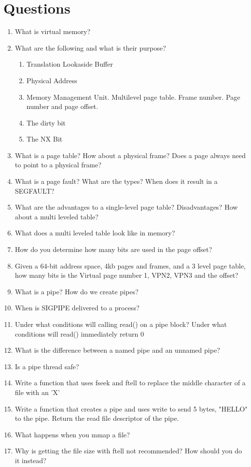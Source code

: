 \section{Questions}

\begin{enumerate}
\item What is virtual memory?
\item What are the following and what is their purpose?
  \begin{enumerate}
    \item Translation Lookaside Buffer
    \item Physical Address
    \item Memory Management Unit. Multilevel page table. Frame number. Page number and page offset.
    \item The dirty bit
    \item The NX Bit
  \end{enumerate}
\item What is a page table? How about a physical frame? Does a page always need to point to a physical frame?
\item What is a page fault? What are the types? When does it result in a SEGFAULT?
\item What are the advantages to a single-level page table? Disadvantages? How about a multi leveled table?
\item What does a multi leveled table look like in memory?
\item How do you determine how many bits are used in the page offset?
\item Given a 64-bit address space, 4kb pages and frames, and a 3 level page table, how many bits is the Virtual page number 1, VPN2, VPN3 and the offset?
\item What is a pipe? How do we create pipes?
\item When is SIGPIPE delivered to a process?
\item Under what conditions will calling read() on a pipe block? Under what conditions will read() immediately return 0
\item What is the difference between a named pipe and an unnamed pipe?
\item Is a pipe thread safe?
\item Write a function that uses fseek and ftell to replace the middle character of a file with an 'X'
\item Write a function that creates a pipe and uses write to send 5 bytes, "HELLO" to the pipe. Return the read file descriptor of the pipe.
\item What happens when you mmap a file?
\item Why is getting the file size with ftell not recommended? How should you do it instead?
\end{enumerate}



